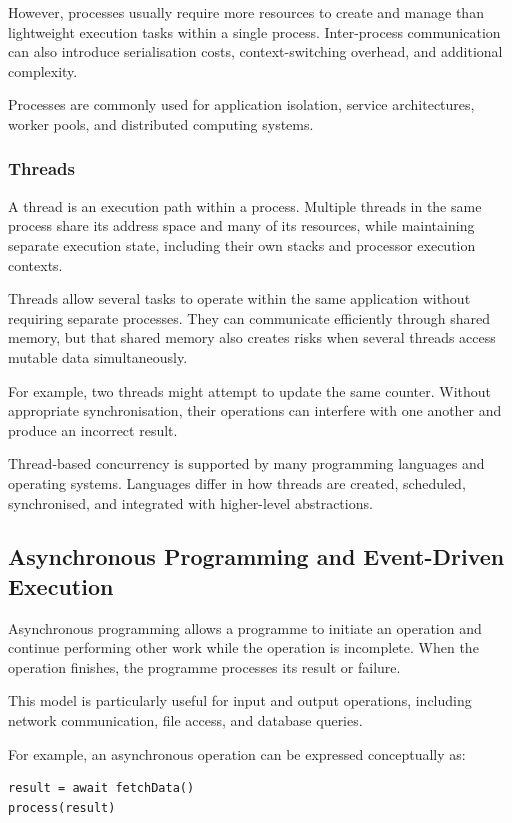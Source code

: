 However, processes usually require more resources to create and manage than lightweight execution tasks within a single process. Inter-process communication can also introduce serialisation costs, context-switching overhead, and additional complexity.

Processes are commonly used for application isolation, service architectures, worker pools, and distributed computing systems.

\subsubsection{Threads}

A thread is an execution path within a process. Multiple threads in the same process share its address space and many of its resources, while maintaining separate execution state, including their own stacks and processor execution contexts.

Threads allow several tasks to operate within the same application without requiring separate processes. They can communicate efficiently through shared memory, but that shared memory also creates risks when several threads access mutable data simultaneously.

For example, two threads might attempt to update the same counter. Without appropriate synchronisation, their operations can interfere with one another and produce an incorrect result.

Thread-based concurrency is supported by many programming languages and operating systems. Languages differ in how threads are created, scheduled, synchronised, and integrated with higher-level abstractions.

\subsection{Asynchronous Programming and Event-Driven Execution}

Asynchronous programming allows a programme to initiate an operation and continue performing other work while the operation is incomplete. When the operation finishes, the programme processes its result or failure.

This model is particularly useful for input and output operations, including network communication, file access, and database queries.

For example, an asynchronous operation can be expressed conceptually as:

\begin{lstlisting}
result = await fetchData()
process(result)
\end{lstlisting}

